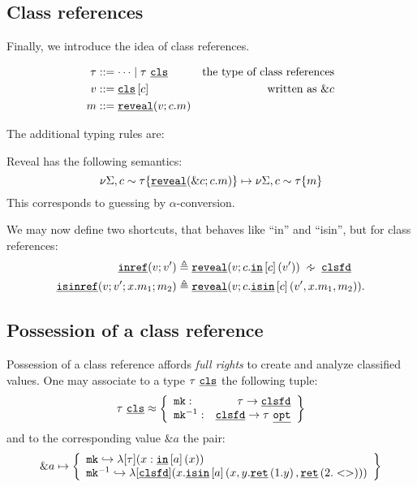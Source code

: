 \documentclass[ manuscript,screen, nonacm]{acmart}
\begin{document}
\subsection{Class references}
Finally, we introduce the idea of class references.

\begin{align*}
    \tau &::= \cdots \mid \tau\ \underline{\mathtt{cls}} \quad\quad &\text{the type of class references}\\
    v &::= \underline{\mathtt{cls}}\left[c\right] &\text{written as } \&c\\
    m &::= \underline{\mathtt{reveal}}(v; c.m)
\end{align*}

The additional typing rules are:

Reveal has the following semantics:
\[
\nu \Sigma, c\sim\tau\{ \underline{\mathtt{reveal}}(\&c; c.m)\} \mapsto \nu\Sigma, c\sim \tau \{m\}
\]
This corresponds to guessing by \(\alpha\)-conversion.

We may now define two shortcuts, that behaves like ``in'' and ``isin'', but for
class references:
\begin{align*}
  \inrefharp{v}{v'} &\triangleq \reveal{v}{c.\inharp{c}{v'}} \approxty \clsfd\\
  \isinref{v}{v'}{x.m_1}{m_2} &\triangleq \reveal{v}{c.\isin{c}{v'}{x.m_1}{m_2}}.
\end{align*}

\subsection{Possession of a class reference}
Possession of a class reference affords \emph{full rights} to create and analyze classified values.
One may associate to a type \(\tau\ \underline{\mathtt{cls}}\) the following tuple:
\[
  \tau\ \underline{\mathtt{cls}} \approx 
  \left\{
    \begin{array}{lr}
    \mathtt{mk}: &\tau \rightarrow \underline{\mathtt{clsfd}} \\
    \mathtt{mk}^{-1}:  &\underline{\mathtt{clsfd}} \rightarrow \tau\ \underline{\mathtt{opt}}
    \end{array}
  \right\}
\]
and to the corresponding value \(\&a\) the pair:
\[
\& a \mapsto 
\left \{
\begin{array}{l}
  \mathtt{mk} \hookrightarrow \lambda[\tau](x : \underline{\mathtt{in}}\left[a\right](x))\\
  \mathtt{mk}^{-1} 
    \hookrightarrow \lambda[\underline{\mathtt{clsfd}}](x.\underline{\mathtt{isin}}\left[a\right](x,y.\underline{\mathtt{ret}}\left(1.y\right),\underline{\mathtt{ret}}\left(2.<>\right)))
\end{array}
\right\}
\]
\end{document}
